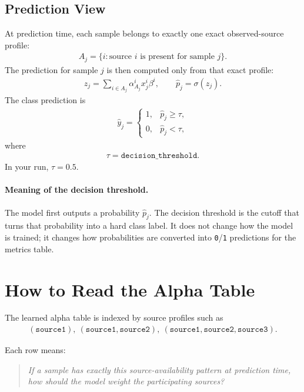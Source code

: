\documentclass[11pt]{article}
\begin{document}
\subsection{Prediction View}
At prediction time, each sample belongs to exactly one exact observed-source
profile:
\begin{align}
A_j = \{i : \text{source } i \text{ is present for sample } j\}.
\end{align}
The prediction for sample $j$ is then computed only from that exact profile:
\begin{align}
z_j
=
\sum_{i \in A_j}
\alpha_{A_j}^i x_j^i \beta^i,
\qquad
\hat{p}_j = \sigma(z_j).
\end{align}
The class prediction is
\begin{align}
\hat{y}_j =
\begin{cases}
1, & \hat{p}_j \ge \tau, \\
0, & \hat{p}_j < \tau,
\end{cases}
\end{align}
where
\begin{align}
\tau = \texttt{decision\_threshold}.
\end{align}
In your run, $\tau = 0.5$.

\paragraph{Meaning of the decision threshold.}
The model first outputs a probability $\hat{p}_j$. The decision threshold is
the cutoff that turns that probability into a hard class label. It does not
change how the model is trained; it changes how probabilities are converted into
\texttt{0}/\texttt{1} predictions for the metrics table.

\section{How to Read the Alpha Table}
The learned alpha table is indexed by source profiles such as
\begin{align*}
(\texttt{source1}),\ 
(\texttt{source1},\texttt{source2}),\ 
(\texttt{source1},\texttt{source2},\texttt{source3}).
\end{align*}

Each row means:
\begin{quote}
\emph{If a sample has exactly this source-availability pattern at prediction
time, how should the model weight the participating sources?}
\end{quote}
\end{document}

